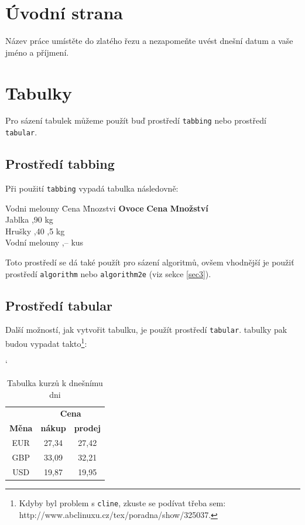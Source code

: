 \documentclass[11pt,a4paper]{article}
\author{Viktor Jančík}
\begin{document}


\section{Úvodní strana}

Název práce umístěte do zlatého řezu a nezapomeňte uvést dnešní datum a vaše jméno a příjmení.

\section{Tabulky}

Pro sázení tabulek můžeme použít buď prostředí \verb|tabbing| nebo prostředí \verb|tabular|.

\subsection{Prostředí tabbing}

Při použití \verb|tabbing| vypadá tabulka následovně:

\begin{tabbing}
	Vodni melouny \quad \= Cena \quad \= Mnozstvi \kill    
    \textbf{	Ovoce} \> \textbf{Cena} \> \textbf{Množství} \\
    Jablka ,90  kg \\
    Hrušky ,40 ,5 kg \\
    Vodní melouny ,--  kus \\
\end{tabbing}

Toto prostředí se dá také použít pro sázení algoritmů, ovšem vhodnější je použiť prostředí \verb|algorithm| nebo \verb|algorithm2e| (viz sekce \ref{sec3}).

\subsection{Prostředí tabular}

Další možností, jak vytvořit tabulku, je použít prostředí \verb|tabular|. tabulky pak budou vypadat takto\footnote{Kdyby byl problem s \texttt{cline}, zkuste se podívat třeba sem: http://www.abclinuxu.cz/tex/poradna/show/325037.}:

\begin{table}[h]
\catcode`
\centering
\begin{tabular}{|c|c|c|}
 \hline
 & \multicolumn{2}{c|}{\textbf{Cena}} \\ \cline{2-3}
 \textbf{Měna} & \textbf{nákup} &  \textbf{prodej} \\
 \hline
 EUR & 27,34 & 27,42 \\
 GBP & 33,09 & 32,21 \\
 USD & 19,87 & 19,95 \\
 \hline
\end{tabular}
\caption{Tabulka kurzů k dnešnímu dni}
\end{table}
\end{document}

